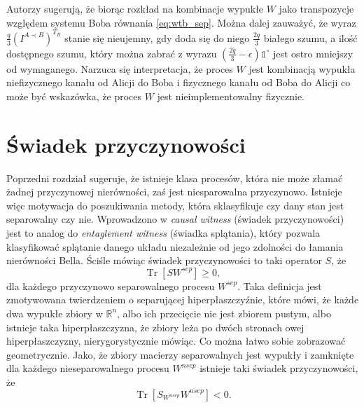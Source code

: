 \documentclass[10pt]{article} %
\DeclareMathOperator{\Trs}{Tr}
\newcommand{\IO}{\mathbb{1}^\circ}
\begin{document}
Autorzy \cite{causal_mode} sugerują, że biorąc rozkład na kombinacje wypukłe $W$ jako transpozycje względem systemu Boba równania \eqref{eq:wtb_sep}. Można dalej zauważyć, że wyraz $\frac{q}{3} \left( I^{A \prec B} \right)^{T_B}$ stanie się nieujemny, gdy doda się do niego $\frac{2q}{3}$ białego szumu,
a ilość dostępnego szumu, który można zabrać z wyrazu $\left( \frac{2q}{3} - \epsilon \right) \IO$ jest ostro mniejszy od wymaganego. Narzuca się interpretacja, że proces $W$ jest kombinacją wypukła niefizycznego kanału od Alicji do Boba i fizycznego kanału od Boba do Alicji co może być wskazówka, że proces
$W$ jest nieimplementowalny fizycznie.

\section{Świadek przyczynowości}
Poprzedni rozdział sugeruje, że istnieje klasa procesów, która nie może złamać żadnej przyczynowej nierówności, zaś jest niesparowalna przyczynowo. Istnieje więc motywacja do poszukiwania metody, która sklasyfikuje czy dany stan jest separowalny czy nie. Wprowadzono w \cite{causal_witness} \textit{causal witness}
(świadek przyczynowości) jest to analog do \textit{entaglement witness} (świadka splątania), który pozwala klasyfikować splątanie danego układu niezależnie od jego zdolności do łamania nierówności Bella. Ściśle mówiąc świadek przyczynowości to taki operator $S$, że
\begin{equation}
\label{eq:witness_gez}
\Trs\left[S W^{sep} \right]\geq 0,
\end{equation}
dla każdego przyczynowo separowalnego procesu $W^{sep}$. Taka definicja jest zmotywowana twierdzeniem o separującej hiperpłaszczyźnie, które mówi, że każde dwa wypukłe zbiory w $\mathbb{R}^n$, albo ich przecięcie nie jest zbiorem pustym, albo istnieje taka hiperpłaszczyzna, że zbiory leża po dwóch stronach owej
hiperpłaszczyzny, nierygorystycznie mówiąc. Co można łatwo sobie zobrazować geometrycznie. Jako, że zbiory macierzy separowalnych jest wypukły i zamknięte dla każdego nieseparowalnego procesu $W^{nsep}$ istnieje taki świadek przyczynowości, że 
\begin{equation}
\Trs \left[ S_{W^{nsep}} W^{nsep} \right] < 0.
\end{equation}
\end{document}
